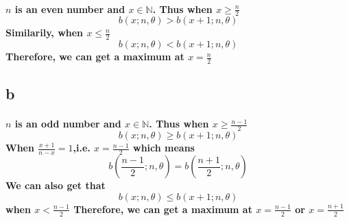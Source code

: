\documentclass{article}
\begin{document}
        \paragraph{
            $n$ is an even number and $x \in \mathbb{N}$.
            Thus when
            $x\geq\frac{n}{2}$
            $$b(x;n,\theta)>b(x+1;n,\theta)$$
            Similarily, when $x\leq\frac{n}{2}$
            $$b(x;n,\theta)<b(x+1;n,\theta)$$
            Therefore, we can get a maximum at $x=\frac{n}{2}$
        }
        \subsection*{b}
        \paragraph{
            $n$ is an odd number and $x \in \mathbb{N}$.
            Thus when $x\geq\frac{n-1}{2}$
            $$b(x;n,\theta)\geq b(x+1;n,\theta)$$
            When $\frac{x+1}{n-x}=1$,i.e. $x=\frac{n-1}{2}$
            which means $$b(\frac{n-1}{2};n,\theta)=b(\frac{n+1}{2};n,\theta)$$
            We can also get that 
            $$b(x;n,\theta)\leq b(x+1;n,\theta)$$
            when $x<\frac{n-1}{2}$
            Therefore, we can get a maximum at $x=\frac{n-1}{2}$ or $x=\frac{n+1}{2}$
        }
\end{document}
